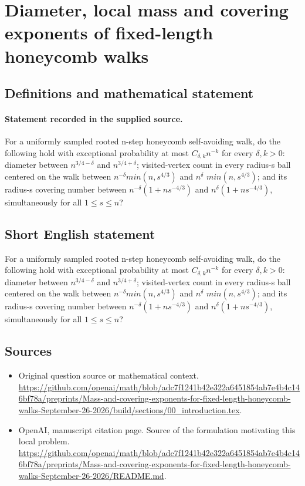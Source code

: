 \documentclass[11pt]{article}
\begin{document}
\section*{Diameter, local mass and covering exponents of fixed-length honeycomb walks}\label{30007368}
\subsection{Definitions and mathematical statement}
\paragraph{Statement recorded in the supplied source.}
For a uniformly sampled rooted n-step honeycomb self-avoiding walk, do the following hold with exceptional probability at most $C_{\delta ,k}n^{-k}$ for every $\delta ,k>0:$ diameter between $n^{3/4-\delta }$ and $n^{3/4+\delta }$; visited-vertex count in every radius-s ball centered on the walk between $n^{-\delta }min(n,s^{4/3})$ and $n^\delta $ $min(n,s^{4/3})$; and its radius-s covering number between $n^{-\delta }(1+ns^{-4/3})$ and $n^\delta (1+ns^{-4/3})$, simultaneously for all $1\leq s\leq n$?
\subsection{Short English statement}
For a uniformly sampled rooted n-step honeycomb self-avoiding walk, do the following hold with exceptional probability at most $C_{\delta ,k}n^{-k}$ for every $\delta ,k>0:$ diameter between $n^{3/4-\delta }$ and $n^{3/4+\delta }$; visited-vertex count in every radius-s ball centered on the walk between $n^{-\delta }min(n,s^{4/3})$ and $n^\delta $ $min(n,s^{4/3})$; and its radius-s covering number between $n^{-\delta }(1+ns^{-4/3})$ and $n^\delta (1+ns^{-4/3})$, simultaneously for all $1\leq s\leq n$?
\subsection{Sources}
\begin{itemize}
\item[S1] Original question source or mathematical context.
\url{https://github.com/openai/math/blob/adc7f1241b42e322a6451854ab7e4b4c146bf78a/preprints/Mass-and-covering-exponents-for-fixed-length-honeycomb-walks-September-26-2026/build/sections/00_introduction.tex}.
\item[S2] OpenAI, manuscript citation page. Source of the formulation motivating this local problem.
\url{https://github.com/openai/math/blob/adc7f1241b42e322a6451854ab7e4b4c146bf78a/preprints/Mass-and-covering-exponents-for-fixed-length-honeycomb-walks-September-26-2026/README.md}.
\end{itemize}
\end{document}
